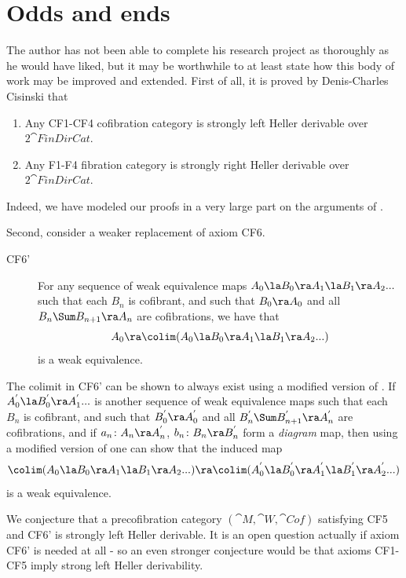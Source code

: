 \section{Odds and ends}
\label{sec:oddsandends}
The author has not been able to complete his research project as thoroughly as he would have liked, but it may be worthwhile to at least state how this body of work may be improved and extended. First of all, it is proved by Denis-Charles Cisinski that 

\begin{thm}
\label{thm:cofcatderivator2}
\mbox{}
\begin{enumerate}
\item
Any CF1-CF4 cofibration category is strongly left Heller derivable over $2{\cat FinDirCat}$. 
\item
Any F1-F4 fibration category is strongly right Heller derivable over $2{\cat FinDirCat}$.
\end{enumerate}
\end{thm}

Indeed, we have modeled our proofs in a very large part on the arguments of \cite{Cisinski2}.

Second, consider a weaker replacement of axiom CF6.

\begin{description}
\item[CF6']
For any sequence of weak equivalence maps $A_0 \la B_0 \ra A_1 \la B_1 \ra A_2 ...$ such that each $B_n$ is cofibrant, and such that $B_0 \ra A_0$ and all $B_n \Sum B_{n+1} \ra A_n$ are cofibrations, we have that 
\[
A_0 \ra \colim (A_0 \la B_0 \ra A_1 \la B_1 \ra A_2 ...)
\]
is a weak equivalence.
\end{description}

The colimit in CF6' can be shown to always exist using a modified version of . If  $A^{'}_0 \la B^{'}_0 \ra A^{'}_1 ...$ is another sequence of weak equivalence maps such that each $B_n$ is cofibrant, and such that $B^{'}_0 \ra A^{'}_0$ and all $B^{'}_n \Sum B^{'}_{n+1} \ra A^{'}_n$ are cofibrations, and if $a_n \colon A_n \ra A^{'}_n$, $b_n \colon B_n \ra B^{'}_n$ form a {\it diagram} map, then using a modified version of  one can show that the induced map
\[
\colim (A_0 \la B_0 \ra A_1 \la B_1 \ra A_2 ...) \ra \colim (A^{'}_0 \la B^{'}_0 \ra A^{'}_1 \la B^{'}_1 \ra A^{'}_2 ...)
\]
is a weak equivalence.

We conjecture that a precofibration category $({\cat M}, {\cat W}, {\cat Cof})$ satisfying CF5 and CF6' is strongly left Heller derivable. It is an open question actually if axiom CF6' is needed at all - so an even stronger conjecture would be that axioms CF1-CF5 imply strong left Heller derivability.

